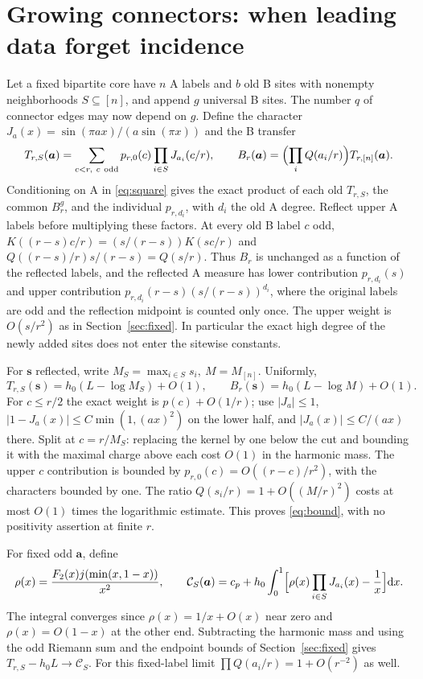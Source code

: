 \section{Growing connectors: when leading data forget incidence}\label{sec:growing}
Let a fixed bipartite core have \(n\) A labels and \(b\) old B sites with nonempty neighborhoods \(S\subseteq[n]\), and append \(g\) universal B sites. The number \(q\) of connector edges may now depend on \(g\). Define the character \(J_a(x)=\sin(\pi a x)/(a\sin(\pi x))\) and the B transfer
\[
 T_{r,S}(\boldsymbol a)=\sum_{c<r,\ c\ {\rm odd}} p_{r,0}(c)\prod_{i\in S}J_{a_i}(c/r),
 \qquad B_r(\boldsymbol a)=\Bigl(\prod_i Q(a_i/r)\Bigr)T_{r,[n]}(\boldsymbol a).
\]
Conditioning on A in \eqref{eq:square} gives the exact product of each old \(T_{r,S}\), the common \(B_r^g\), and the individual \(p_{r,d_i}\), with \(d_i\) the old A degree. Reflect upper A labels before multiplying these factors. At every old B label \(c\) odd, \(K((r-s)c/r)=(s/(r-s))K(sc/r)\) and \(Q((r-s)/r)s/(r-s)=Q(s/r)\). Thus \(B_r\) is unchanged as a function of the reflected labels, and the reflected A measure has lower contribution \(p_{r,d_i}(s)\) and upper contribution \(p_{r,d_i}(r-s)(s/(r-s))^{d_i}\), where the original labels are odd and the reflection midpoint is counted only once. The upper weight is \(O(s/r^2)\) as in Section~\ref{sec:fixed}. In particular the exact high degree of the newly added sites does not enter the sitewise constants.

For \(\boldsymbol s\) reflected, write \(M_S=\max_{i\in S}s_i,\ M=M_{[n]}\). Uniformly,
\begin{equation}\label{eq:bound}
 T_{r,S}(\boldsymbol s)=h_0(L-\log M_S)+O(1),\qquad
 B_r(\boldsymbol s)=h_0(L-\log M)+O(1).
\end{equation}
For \(c\le r/2\) the exact weight is \(p(c)+O(1/r)\); use \(|J_a|\le1\), \(|1-J_a(x)|\le C\min(1,(ax)^2)\) on the lower half, and \(|J_a(x)|\le C/(ax)\) there. Split at \(c=r/M_S\): replacing the kernel by one below the cut and bounding it with the maximal charge above each cost \(O(1)\) in the harmonic mass. The upper \(c\) contribution is bounded by \(p_{r,0}(c)=O((r-c)/r^2)\), with the characters bounded by one. The ratio \(Q(s_i/r)=1+O((M/r)^2)\) costs at most \(O(1)\) times the logarithmic estimate. This proves \eqref{eq:bound}, with no positivity assertion at finite \(r\).

For fixed odd \(\boldsymbol a\), define
\[
 \rho(x)=\frac{F_2(x)j(\min(x,1-x))}{x^2},\qquad
 \mathcal C_S(\boldsymbol a)=c_p+h_0\int_0^1
       \Bigl[\rho(x)\prod_{i\in S}J_{a_i}(x)-\frac1x\Bigr]\mathrm d x .
\]
The integral converges since \(\rho(x)=1/x+O(x)\) near zero and \(\rho(x)=O(1-x)\) at the other end. Subtracting the harmonic mass and using the odd Riemann sum and the endpoint bounds of Section~\ref{sec:fixed} gives \(T_{r,S}-h_0L\to\mathcal C_S\). For this fixed-label limit \(\prod Q(a_i/r)=1+O(r^{-2})\) as well.

